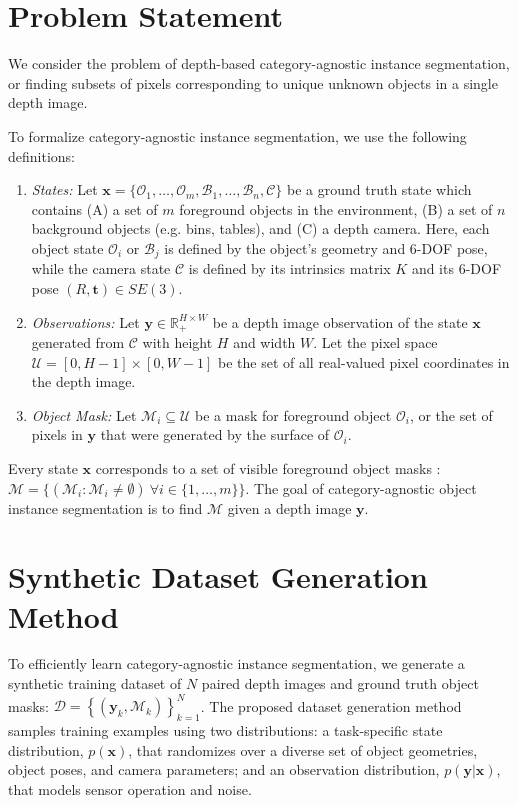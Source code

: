 \documentclass[letterpaper, 10 pt, conference]{ieeeconf}  \pdfoutput=1
\numberwithin{equation}{section}
\newcommand{\bx}{\mathbf{x}}
\newcommand{\by}{\mathbf{y}}
\newcommand{\bt}{\mathbf{t}}
\newcommand{\mO}{\mathcal{O}}
\newcommand{\mB}{\mathcal{B}}
\newcommand{\mC}{\mathcal{C}}
\newcommand{\mU}{\mathcal{U}}
\newcommand{\mD}{\mathcal{D}}
\newcommand{\mM}{\mathcal{M}}
\begin{document}
 \section{Problem Statement} 

We consider the problem of depth-based category-agnostic instance segmentation, or finding subsets of pixels corresponding to unique unknown objects in a single depth image.

To formalize category-agnostic instance segmentation, we use the following definitions:
\begin{enumerate}
    \item \textit{States:} Let $\bx = \{\mO_1, \hdots, \mO_m, \mB_1, \hdots, \mB_n, \mC\}$ be a ground truth state which contains (A) a set of $m$ foreground objects in the environment, (B) a set of $n$ background objects (e.g. bins, tables), and (C) a depth camera. Here, each object state $\mO_i$ or $\mB_j$ is defined by the object's geometry and 6-DOF pose, while the camera state $\mC$ is defined by its intrinsics matrix $K$ and its 6-DOF pose $(R, \bt) \in SE(3)$.
    \item \textit{Observations:} Let $\by \in \mathbb{R}^{H\times W}_+$ be a depth image observation of the state $\bx$ generated from $\mC$ with height $H$ and width $W$.
    Let the pixel space $\mU = [0, H-1] \times [0, W-1]$ be the set of all real-valued pixel coordinates in the depth image.
    \item \textit{Object Mask:} Let $\mathcal{M}_i \subseteq \mathcal{U}$ be a mask for foreground object $\mO_i$, or the set of pixels in $\by$ that were generated by the surface of $\mO_i$.
\end{enumerate}

Every state $\bx$ corresponds to a set of visible foreground object masks : $\mM = \{(\mM_i : \mM_i \neq \emptyset)\ \forall i \in \{1,\hdots,m\}\}$. 
The goal of category-agnostic object instance segmentation is to find $\mM$ given a depth image $\by$.




 \section{Synthetic Dataset Generation Method} 

To efficiently learn category-agnostic instance segmentation, we generate a synthetic training dataset of $N$ paired depth images and ground truth object masks: $\mD = \left\{ (\by_k, \mM_k) \right\}_{k=1}^N$.
The proposed dataset generation method samples training examples using two distributions: a task-specific state distribution, $p(\bx)$, that randomizes over a diverse set of object geometries, object poses, and camera parameters; and an observation distribution, $p(\by | \bx)$, that models sensor operation and noise.
\end{document}
